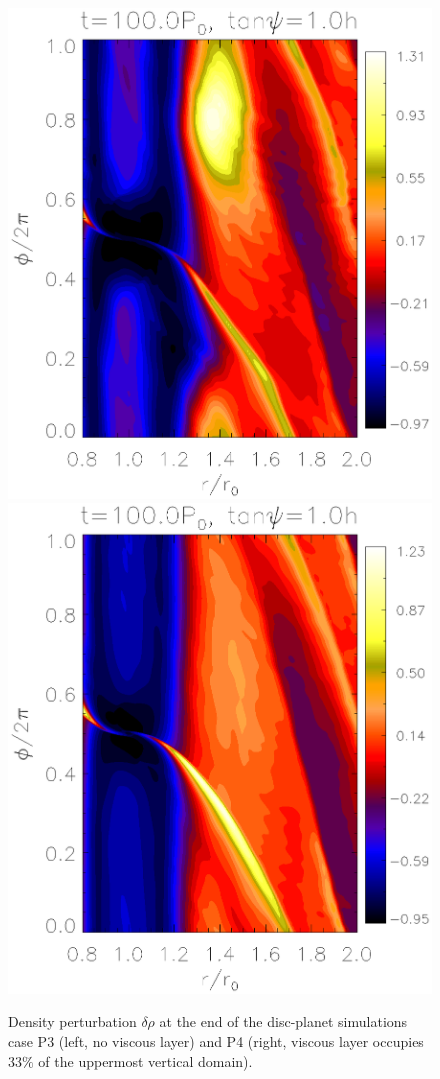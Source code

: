 \begin{figure}
   \centering
   \includegraphics[scale=.39,clip=true,trim=0cm 1.84cm 0cm
     0cm]{figures/jup0_3h_pdisk010}\includegraphics[scale=.39,clip=true,trim=2.3cm
     1.84cm 0cm
     0cm]{figures/jup1_3h_pdisk008}
   \caption{Density perturbation $\delta\rho$ at the end of the
     disc-planet simulations case P3 (left, no viscous layer) and P4
     (right, viscous layer occupies $33\%$ of the uppermost vertical
     domain).   
     \label{jup0_3h}}
\end{figure}
 


